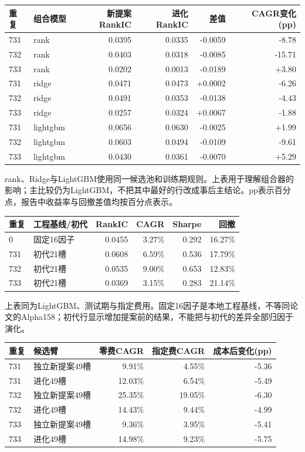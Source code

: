 \documentclass[UTF8,a4paper,10pt]{ctexart}
\begin{document}
\begin{center}\scriptsize\begin{tabularx}{\textwidth}{llrrrr}\toprule
重复 & 组合模型 & 新提案RankIC & 进化RankIC & 差值 & CAGR变化(pp)\\\midrule
731 & rank & 0.0395 & 0.0335 & -0.0059 & -8.78\\
732 & rank & 0.0403 & 0.0318 & -0.0085 & -15.71\\
733 & rank & 0.0202 & 0.0013 & -0.0189 & +3.80\\
731 & ridge & 0.0471 & 0.0473 & +0.0002 & -6.26\\
732 & ridge & 0.0491 & 0.0353 & -0.0138 & -4.43\\
733 & ridge & 0.0257 & 0.0324 & +0.0067 & -1.88\\
731 & lightgbm & 0.0656 & 0.0630 & -0.0025 & +1.99\\
732 & lightgbm & 0.0603 & 0.0494 & -0.0109 & -9.61\\
733 & lightgbm & 0.0430 & 0.0361 & -0.0070 & +5.29\\
\bottomrule\end{tabularx}\end{center}

rank、Ridge与LightGBM使用同一候选池和训练期规则。上表用于理解组合器的影响；主比较仍为LightGBM，不把其中最好的行改成事后主结论。pp表示百分点，报告中收益率与回撤差值均按百分点表示。

\begin{center}\scriptsize\begin{tabularx}{\textwidth}{lXrrrr}\toprule
重复 & 工程基线/初代 & RankIC & CAGR & Sharpe & 回撤\\\midrule
0 & 固定16因子 & 0.0455 & 3.27\% & 0.292 & 16.27\%\\
731 & 初代21槽 & 0.0608 & 6.59\% & 0.536 & 17.79\%\\
732 & 初代21槽 & 0.0535 & 9.00\% & 0.653 & 12.83\%\\
733 & 初代21槽 & 0.0369 & 3.15\% & 0.283 & 21.14\%\\
\bottomrule\end{tabularx}\end{center}

上表同为LightGBM、测试期与指定费用。固定16因子是本地工程基线，不等同论文的Alpha158；初代行显示增加提案前的结果，不能把与初代的差异全部归因于演化。

\begin{center}\small\begin{tabularx}{\textwidth}{lXrrr}\toprule
重复 & 候选臂 & 零费CAGR & 指定费CAGR & 成本后变化(pp)\\\midrule
731 & 独立新提案49槽 & 9.91\% & 4.55\% & -5.36\\
731 & 进化49槽 & 12.03\% & 6.54\% & -5.49\\
732 & 独立新提案49槽 & 25.35\% & 19.05\% & -6.30\\
732 & 进化49槽 & 14.43\% & 9.44\% & -4.99\\
733 & 独立新提案49槽 & 9.36\% & 3.95\% & -5.41\\
733 & 进化49槽 & 14.98\% & 9.23\% & -5.75\\
\bottomrule\end{tabularx}\end{center}
\end{document}
